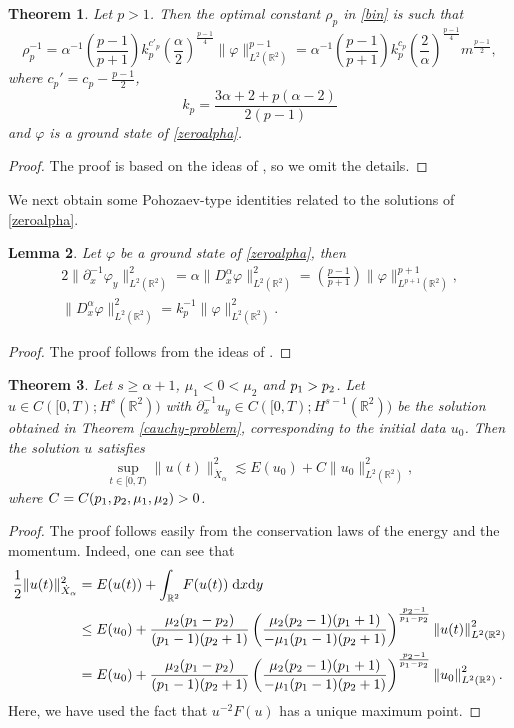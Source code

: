\documentclass[10pt]{article}
\newcommand{\norm}[1]{\left\|   #1   \right\|}
\newcommand{\paar}[1]{\left( #1 \right)}
\numberwithin{equation}{section}
\newtheorem{theorem}{\quad Theorem}[section]
\newtheorem{lemma}[theorem]{\quad Lemma}
\newcommand{\lt}{{L^2(\mathbb{R}^2)}}
\newcommand{\dz}{\;{\rm d}x{\rm d}y}
\newcommand{\ff}{\varphi}
\newcommand{\nd}{{\partial_x^{-1}}}
\newcommand{\dx}{D_x^{\alpha}}
\newcommand{\al}{\alpha}
\newcommand{\rr}{\mathbb{R}}
\newcommand{\rt}{{\mathbb{R}^2}}
\begin{document}
	
	\begin{theorem}\label{sharp-constant}
		Let $p>1$. Then the optimal constant $\rho_p$  in \eqref{bin} is such that
		\begin{equation}\label{best-c}
			\rho_p^{-1}=
			\al^{-1}\left(\frac{p-1}{p+1}\right)k_p^{c'_p}\left(\frac{\al}{2}\right)^{\frac{p-1}{4}}\|\ff\|_\lt^{p-1}
			=\al^{-1}\left(\frac{p-1}{p+1}\right)k_p^{c_p}\left(\frac{2}{\al}\right)^{\frac{p-1}{4}} 
			m^{\frac{p-1}{2}},
		\end{equation}
		where  $c_p'=c_p-\frac{p-1}{2}$,
		\[
		k_p=\frac{3\al+2+p(\al-2)}{2(p-1)}
		\] 
		and $\ff$ is a ground state of \eqref{zeroalpha}.
	\end{theorem}
	\begin{proof}
		The proof is based on the ideas of \cite[Theorem 1.2]{zamp}, so we omit the details.
	\end{proof}
	
	We next obtain some Pohozaev-type identities related to the solutions of \eqref{zeroalpha}.
	\begin{lemma}\label{poho-homo}
		Let $\ff$ be a ground state of \eqref{zeroalpha}, then
		\begin{eqnarray}
			2\|\nd \ff_y\|_\lt^2=\al \|\dx\ff\|_\lt^2=	\left(\frac{p-1}{p+1}\right)\|\ff\|_{L^{p+1}(\rr^2)}^{p+1},\\
			\|\dx \ff\|_\lt^2	=k_p^{-1} \|\ff\|_\lt^2.
		\end{eqnarray}
	\end{lemma} 
	\begin{proof}
		The proof follows from the ideas of \cite{dbs-1}. 
	\end{proof}
	
		\begin{theorem}
				Let $s\geq\al+1$, $\mu_1<0<\mu_2$ and ${p_1}>{p_2}$. Let $u\in C([0,T);H^s(\rt))$ with $\nd u_y\in C([0,T);H^{s-1}(\rt))$ be the solution obtained in Theorem \ref{cauchy-problem}, corresponding to the initial data $u_0$.
		Then the solution $u$ satisfies
		\[
		\sup_{t\in[0,T)}\|u(t)\|_{\dot{X}_\al}^2\lesssim 
		E(u_0)+C\|u_0\|_\lt^2,
		\]
		where $C=C({p_1},{p_2},\mu_1,\mu_2)>0$.
	\end{theorem}
	\begin{proof}
		The proof follows easily from the conservation laws of  the energy and the momentum. Indeed, one can see that
		\[
		\begin{split}
			\frac12\|u(t)\|_{\dot{X}_\al}^2
			&= E(u(t))
			+\int_\rt F(u(t))\dz\\
			&
			\leq E(u_0)+\frac{\mu_2(\po-\poo)}{(\po-1)(\poo+1)}
			\paar{\frac{\mu_2(\poo-1)(\po+1)}{-\mu_1(\po-1)(\poo+1)}}
			^\frac{\poo-1}{\po-\poo}
			\norm{u(t)}_\lt^2
			\\
			&=
			E(u_0)+\frac{\mu_2(\po-\poo)}{(\po-1)(\poo+1)}
			\paar{\frac{\mu_2(\poo-1)(\po+1)}{-\mu_1(\po-1)(\poo+1)}}
			^\frac{\poo-1}{\po-\poo}\norm{u_0}_\lt^2.
		\end{split}
		\]
		Here, we have used the fact that $u^{-2}F(u)$ has a unique maximum point.
	\end{proof}
	
\end{document}
